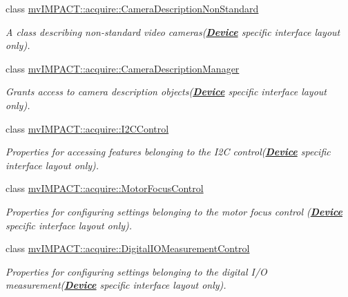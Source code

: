 \begin{DoxyCompactItemize}
class \hyperlink{classmv_i_m_p_a_c_t_1_1acquire_1_1_camera_description_non_standard}{mv\+I\+M\+P\+A\+C\+T\+::acquire\+::\+Camera\+Description\+Non\+Standard}
\begin{DoxyCompactList}\small\item\em A class describing non-\/standard video cameras({\bfseries \hyperlink{classmv_i_m_p_a_c_t_1_1acquire_1_1_device}{Device}} specific interface layout only). \end{DoxyCompactList}\item 
class \hyperlink{classmv_i_m_p_a_c_t_1_1acquire_1_1_camera_description_manager}{mv\+I\+M\+P\+A\+C\+T\+::acquire\+::\+Camera\+Description\+Manager}
\begin{DoxyCompactList}\small\item\em Grants access to camera description objects({\bfseries \hyperlink{classmv_i_m_p_a_c_t_1_1acquire_1_1_device}{Device}} specific interface layout only). \end{DoxyCompactList}\item 
class \hyperlink{classmv_i_m_p_a_c_t_1_1acquire_1_1_i2_c_control}{mv\+I\+M\+P\+A\+C\+T\+::acquire\+::\+I2\+C\+Control}
\begin{DoxyCompactList}\small\item\em Properties for accessing features belonging to the I2\+C control({\bfseries \hyperlink{classmv_i_m_p_a_c_t_1_1acquire_1_1_device}{Device}} specific interface layout only). \end{DoxyCompactList}\item 
class \hyperlink{classmv_i_m_p_a_c_t_1_1acquire_1_1_motor_focus_control}{mv\+I\+M\+P\+A\+C\+T\+::acquire\+::\+Motor\+Focus\+Control}
\begin{DoxyCompactList}\small\item\em Properties for configuring settings belonging to the motor focus control ({\bfseries \hyperlink{classmv_i_m_p_a_c_t_1_1acquire_1_1_device}{Device}} specific interface layout only). \end{DoxyCompactList}\item 
class \hyperlink{classmv_i_m_p_a_c_t_1_1acquire_1_1_digital_i_o_measurement_control}{mv\+I\+M\+P\+A\+C\+T\+::acquire\+::\+Digital\+I\+O\+Measurement\+Control}
\begin{DoxyCompactList}\small\item\em Properties for configuring settings belonging to the digital I/\+O measurement({\bfseries \hyperlink{classmv_i_m_p_a_c_t_1_1acquire_1_1_device}{Device}} specific interface layout only). \end{DoxyCompactList}\item 

\end{DoxyCompactItemize}
